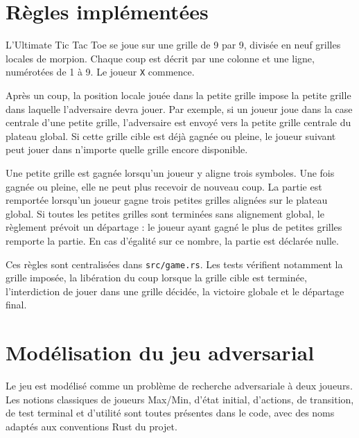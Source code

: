 \documentclass{pssbmac}
\begin{document}
\section{Règles implémentées}

L'Ultimate Tic Tac Toe se joue sur une grille de 9 par 9, divisée en neuf grilles locales de morpion. Chaque coup est décrit par une colonne et une ligne, numérotées de 1 à 9. Le joueur \texttt{X} commence.

Après un coup, la position locale jouée dans la petite grille impose la petite grille dans laquelle l'adversaire devra jouer. Par exemple, si un joueur joue dans la case centrale d'une petite grille, l'adversaire est envoyé vers la petite grille centrale du plateau global. Si cette grille cible est déjà gagnée ou pleine, le joueur suivant peut jouer dans n'importe quelle grille encore disponible.

Une petite grille est gagnée lorsqu'un joueur y aligne trois symboles. Une fois gagnée ou pleine, elle ne peut plus recevoir de nouveau coup. La partie est remportée lorsqu'un joueur gagne trois petites grilles alignées sur le plateau global. Si toutes les petites grilles sont terminées sans alignement global, le règlement prévoit un départage : le joueur ayant gagné le plus de petites grilles remporte la partie. En cas d'égalité sur ce nombre, la partie est déclarée nulle.

Ces règles sont centralisées dans \texttt{src/game.rs}. Les tests vérifient notamment la grille imposée, la libération du coup lorsque la grille cible est terminée, l'interdiction de jouer dans une grille décidée, la victoire globale et le départage final.

\section{Modélisation du jeu adversarial}

Le jeu est modélisé comme un problème de recherche adversariale à deux joueurs. Les notions classiques de joueurs Max/Min, d'état initial, d'actions, de transition, de test terminal et d'utilité sont toutes présentes dans le code, avec des noms adaptés aux conventions Rust du projet.
\end{document}
